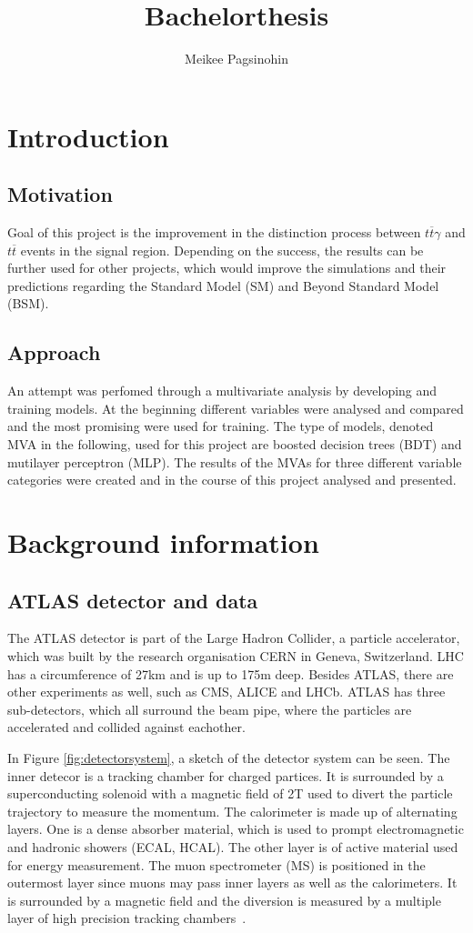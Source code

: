 \documentclass[11pt]{scrartcl}
\title{Bachelorthesis}
\author{Meikee Pagsinohin}
\begin{document}
\tableofcontents
\newpage

\section{Introduction}

	\subsection{Motivation}
		Goal of this project is the improvement in the distinction process between $t\overline{t}\gamma$ and $t\overline{t}$ events in the signal region. Depending on the success, the results can be further used for other projects, which would improve the simulations and their predictions regarding the Standard Model (SM) and Beyond Standard Model (BSM). 

	\subsection{Approach}
	\label{sec:approach}
		An attempt was perfomed through a multivariate analysis by developing and training models. At the beginning different variables were analysed and compared and the most promising were used for training. The type of models, denoted MVA in the following, used for this project are boosted decision trees (BDT) and mutilayer perceptron (MLP). The results of the MVAs for three different variable categories were created and in the course of this project analysed and presented.

\section{Background information}
	\subsection{ATLAS detector and data}
	The ATLAS detector is part of the Large Hadron Collider, a particle accelerator, which was built by the research organisation CERN in Geneva, Switzerland. LHC has a circumference of 27km and is up to 175m deep. Besides ATLAS, there are other experiments as well, such as CMS, ALICE and LHCb. ATLAS has three sub-detectors, which all surround the beam pipe, where the particles are accelerated and collided against eachother.
	
	In Figure \ref{fig:detectorsystem}, a sketch of the detector system can be seen. The inner detecor is a tracking chamber for charged partices. It is surrounded by a superconducting solenoid with a magnetic field of 2T used to divert the particle trajectory to measure the momentum. The calorimeter is made up of alternating layers. One is a dense absorber material, which is used to prompt electromagnetic and hadronic showers (ECAL, HCAL). The other layer is of active material used for energy measurement. The muon spectrometer (MS) is positioned in the outermost layer since muons may pass inner layers as well as the calorimeters. It is surrounded by a magnetic field and the diversion is measured by a multiple layer of high precision tracking chambers~\cite{ATLAS, TTG}. 
	
\end{document}
